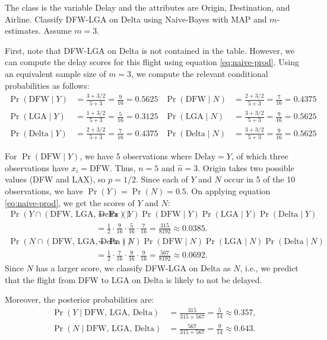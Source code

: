 \documentclass[11pt]{article}
\newcommand*{\nhat}{\widehat{n}}
\newcommand*{\textCP}[2]{\Pr(\text{#1} \mid #2)}
\begin{document}
The class is the variable Delay and the attributes are Origin, Destination, and Airline.
Classify DFW-LGA on Delta using Naive-Bayes with MAP and $m$-estimates. Assume $m = 3$.

First, note that DFW-LGA on Delta is not contained in the table.
However, we can compute the delay scores for this flight using equation \eqref{eq:naive-prod}.
Using an equivalent sample size of $m = 3$, we compute the relevant conditional probabilities as follows:
\begin{align*}
\textCP{DFW}{Y} &= \frac{3 + 3/2}{5 + 3} = \frac{9}{16} = 0.5625
& \textCP{DFW}{N} &= \frac{2 + 3/2}{5 + 3} = \frac{7}{16} = 0.4375
\\ \textCP{LGA}{Y} &= \frac{1 + 3/2}{5 + 3} = \frac{5}{16} = 0.3125
& \textCP{LGA}{N} &= \frac{3 + 3/2}{5 + 3} = \frac{9}{16} = 0.5625
\\ \textCP{Delta}{Y} &= \frac{2 + 3/2}{5 + 3} = \frac{7}{16} = 0.4375
& \textCP{Delta}{N} &= \frac{3 + 3/2}{5 + 3} = \frac{9}{16} = 0.5625
\end{align*}

For $\textCP{DFW}{Y}$, we have 5 observations where $\text{Delay} = Y$,
of which three observations have $x_i = \text{DFW}$. Thus, $n = 5$ and $\nhat = 3$.
Origin takes two possible values (DFW and LAX), so $p = 1/2$.
Since each of $Y$ and $N$ occur in 5 of the 10 observations, we have $\Pr(Y) = \Pr(N) = 0.5$.
On applying equation \eqref{eq:naive-prod}, we get the scores of $Y$ and $N$:
\begin{align*}
\Pr(Y \cap (\text{DFW, LGA, Delta})) &= \Pr(Y)\textCP{DFW}{Y}\textCP{LGA}{Y}\textCP{Delta}{Y}
    \\ &= \frac{1}{2}\cdot\frac{9}{16}\cdot\frac{5}{16}\cdot\frac{7}{16}
    = \frac{315}{8192} \approx 0.0385.
\\ \Pr(N \cap (\text{DFW, LGA, Delta})) &= \Pr(N)\textCP{DFW}{N}\textCP{LGA}{N}\textCP{Delta}{N}
    \\ &= \frac{1}{2}\cdot\frac{7}{16}\cdot\frac{9}{16}\cdot\frac{9}{16}
    = \frac{567}{8192} \approx 0.0692.
\end{align*}
Since $N$ has a larger score, we classify DFW-LGA on Delta as $N$,
i.e., we predict that the flight from DFW to LGA on Delta is likely to not be delayed.

Moreover, the posterior probabilities are:
\begin{align*}
\Pr(Y \mid \text{DFW, LGA, Delta}) &= \frac{315}{315 + 567} = \frac{5}{14} \approx 0.357,
\\ \Pr(N \mid \text{DFW, LGA, Delta}) &= \frac{567}{315 + 567} = \frac{9}{14} \approx 0.643.
\end{align*}
\end{document}
